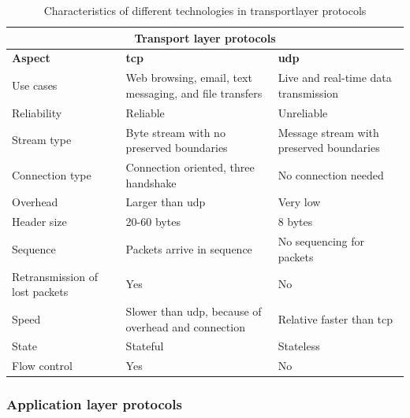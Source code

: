 \begin{table}[htbp]
    \small
    \centering
    \caption{Characteristics of different technologies in transportlayer protocols}
    \label{tab: transportlayer}
    \begin{tabular}{|m{}|m{}|m{}|}
    \hline
    \multicolumn{3}{|c|}{\textbf{Transport layer protocols}}                                                            \\ \hline
    \textbf{Aspect}                         & \textbf{\gls{tcp}}             & \textbf{\gls{udp}}        \\ \hline
    Use cases                      & Web browsing, email, text messaging, and file transfers & Live and real-time data transmission \\ \hline
    Reliability                    & Reliable        & Unreliable \\ \hline
    Stream type                    & Byte stream with no preserved boundaries & Message stream with preserved boundaries \\ \hline
    Connection type                & Connection oriented, three handshake & No connection needed \\ \hline
    Overhead                       & Larger than \gls{udp} & Very low   \\ \hline
    Header size                    & 20-60 bytes     & 8 bytes    \\ \hline
    Sequence                       & Packets arrive in sequence & No sequencing for packets \\ \hline
    Retransmission of lost packets & Yes             & No         \\ \hline
    Speed                          & Slower than \gls{udp}, because of overhead and connection & Relative faster than \gls{tcp} \\ \hline
    State                          & Stateful        & Stateless  \\ \hline
    Flow control                   & Yes             & No         \\ \hline
    \end{tabular}
    \end{table}



\subsubsection{Application layer protocols}



